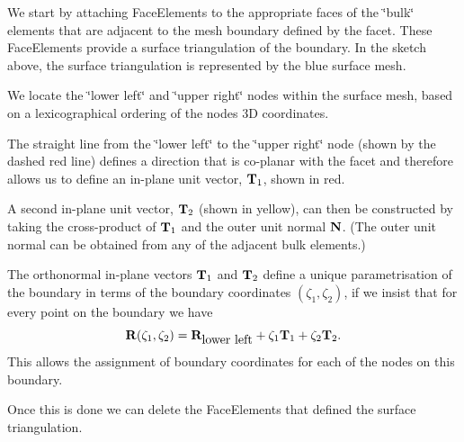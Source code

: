 \begin{DoxyEnumerate}
\item We start by attaching {\ttfamily Face\+Elements} to the appropriate faces of the \char`\"{}bulk\char`\"{} elements that are adjacent to the mesh boundary defined by the facet. These {\ttfamily Face\+Elements} provide a surface triangulation of the boundary. In the sketch above, the surface triangulation is represented by the blue surface mesh. ~\newline
~\newline

\item We locate the \char`\"{}lower left\char`\"{} and \char`\"{}upper right\char`\"{} nodes within the surface mesh, based on a lexicographical ordering of the nodes\textquotesingle{} 3D coordinates. ~\newline
~\newline

\item The straight line from the \char`\"{}lower left\char`\"{} to the \char`\"{}upper right\char`\"{} node (shown by the dashed red line) defines a direction that is co-\/planar with the facet and therefore allows us to define an in-\/plane unit vector, $ {\bf T}_1$, shown in red. ~\newline
~\newline

\item A second in-\/plane unit vector, $ {\bf T}_2$ (shown in yellow), can then be constructed by taking the cross-\/product of $ {\bf T}_1$ and the outer unit normal $ {\bf N} $. (The outer unit normal can be obtained from any of the adjacent bulk elements.) ~\newline
~\newline

\item The orthonormal in-\/plane vectors $ {\bf T}_1$ and $ {\bf T}_2$ define a unique parametrisation of the boundary in terms of the boundary coordinates $ (\zeta_1,\zeta_2) $, if we insist that for every point on the boundary we have \[ {\bf R}(\zeta_1,\zeta_2) = {\bf R}_{\mbox{lower left}} + \zeta_1 {\bf T}_1 + \zeta_2 {\bf T}_2. \] This allows the assignment of boundary coordinates for each of the nodes on this boundary. ~\newline
~\newline

\item Once this is done we can delete the {\ttfamily Face\+Elements} that defined the surface triangulation. ~\newline
~\newline


\end{DoxyEnumerate}
